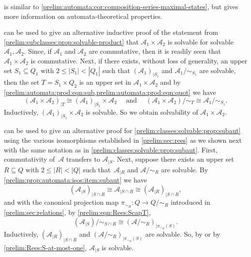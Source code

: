 is similar to \cref{prelim:automata:cor:composition-series-maximal-states},
but gives more information on automata-theoretical properties.

\begin{remark}
can be used to give an alternative inductive 
proof of the statement from \cref{prelim:subclasses:prop:solvable-product} that $\mathcal A_1 \times \mathcal A_2$ is solvable
for solvable~$\mathcal A_1, \mathcal A_2$.
Since, if $\mathcal A_1$ and $\mathcal A_2$
are commutative, then it is readily seen that $\mathcal A_1 \times \mathcal A_2$
is commutative.
Next, if there exists, without loss of generality,
an upper set $S_1 \subseteq Q_1$
with $2 \le |S_1| < |Q_1|$
such that $( \mathcal A_1 )_{|S_1}$
and $\mathcal A_1 / {\sim_{S_1}}$ are solvable, then the set $T = S_1 \times Q_2$
is an upper set in $\mathcal A_1 \times \mathcal A_2$
and by \cref{prelim:automata:prod:eqn:sub,prelim:automata:prod:eqn:quot} we have
\[
( \mathcal A_1 \times \mathcal A_2 )_{|T} \cong (\mathcal A_1)_{|S_1} \times \mathcal A_2 \quad 
\text{ and }
\quad
( \mathcal A_1 \times \mathcal A_2 ) / {\sim_T} \cong \mathcal A_1 / {\sim_{S_1}}.
\]
Inductively, $(\mathcal A_1)_{|S_1} \times \mathcal A_2$
is solvable. So we obtain solvability of $\mathcal A_1 \times \mathcal A_2$.
\end{remark}

\begin{remark}
	can be used to give an alternative proof
	for \cref{prelim:classes:solvable:prop:subaut}
	using the various isomorphisms established in \cref{prelim:sec:rees}
	as we shown next with the same notation as in \cref{prelim:classes:solvable:prop:subaut}.	
	First, commutativity of~$\mathcal A$
	transfers to $\mathcal A_{|S}$.
	Next, suppose
	there exists an upper set $R \subseteq Q$
	with $2 \le |R| < |Q|$
	such that~$\mathcal A_{|R}$
	and $\mathcal A / {\sim_R}$ are solvable. 
	By \cref{prelim:prop:automata:isos:item:subaut} we have
	\[
	( \mathcal A_{|S} )_{|S \cap R} \cong \mathcal A_{|S \cap R} \cong ( \mathcal A_{|R} )_{|S \cap R},
	\]
	and with the canonical projection map  $\pi_{\sim_R} \colon Q \to Q / {\sim_R}$ introduced in \cref{prelim:sec:relations}, 
	by \cref{prelim:eqn:Rees:ScapT}, %
\[
(\mathcal A_{|S}) / {\sim_{S\cap R}} \cong (\mathcal A / {\sim_R})_{|\pi_{\sim_R}(S)}.
\]
Inductively, $( \mathcal A_{|R} )_{|S \cap R}$ 
and $(\mathcal A / {\sim_R})_{|\pi_{\sim_R}(S)}$ are solvable.
So, by 
or by \cref{prelim:Rees:S-at-most-one}, $\mathcal A_{|S}$ is solvable.	
\end{remark}

